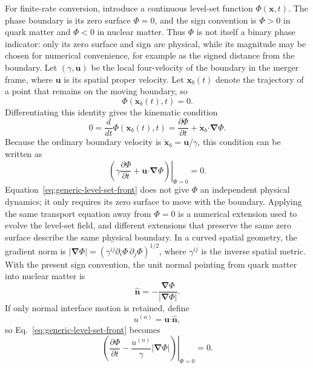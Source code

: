 \documentclass[11pt]{article}
\begin{document}
For finite-rate conversion, introduce a continuous level-set function \(\Phi(\boldsymbol{x},t)\).
The phase boundary is its zero surface \(\Phi=0\), and the sign convention is \(\Phi>0\) in quark matter and \(\Phi<0\) in nuclear matter.
Thus \(\Phi\) is not itself a binary phase indicator: only its zero surface and sign are physical, while its magnitude may be chosen for numerical convenience, for example as the signed distance from the boundary.
Let \((\gamma,\boldsymbol{u})\) be the local four-velocity of the boundary in the merger frame, where \(\boldsymbol{u}\) is its spatial proper velocity.
Let \(\boldsymbol{x}_b(t)\) denote the trajectory of a point that remains on the moving boundary, so
\begin{equation}
\Phi(\boldsymbol{x}_b(t),t)=0.
\end{equation}
Differentiating this identity gives the kinematic condition
\begin{equation}
0
=
\frac{d}{dt}\Phi(\boldsymbol{x}_b(t),t)
=
\frac{\partial\Phi}{\partial t}
+
\dot{\boldsymbol{x}}_b
\boldsymbol{\cdot}
\boldsymbol{\nabla}\Phi.
\end{equation}
Because the ordinary boundary velocity is \(\dot{\boldsymbol{x}}_b=\boldsymbol{u}/\gamma\), this condition can be written as
\begin{equation}
\left.
\left(
\gamma
\frac{\partial\Phi}{\partial t}
+
\boldsymbol{u}
\boldsymbol{\cdot}
\boldsymbol{\nabla}\Phi
\right)
\right|_{\Phi=0}
=0.
\label{eq:generic-level-set-front}
\end{equation}
Equation~\eqref{eq:generic-level-set-front} does not give \(\Phi\) an independent physical dynamics; it only requires its zero surface to move with the boundary.
Applying the same transport equation away from \(\Phi=0\) is a numerical extension used to evolve the level-set field, and different extensions that preserve the same zero surface describe the same physical boundary.
In a curved spatial geometry, the gradient norm is \(\left|\boldsymbol{\nabla}\Phi\right|=(\gamma^{ij}\partial_i\Phi\,\partial_j\Phi)^{1/2}\), where \(\gamma^{ij}\) is the inverse spatial metric.
With the present sign convention, the unit normal pointing from quark matter into nuclear matter is
\begin{equation}
\widehat{\boldsymbol{n}}
=
-
\frac{\boldsymbol{\nabla}\Phi}
{\left|\boldsymbol{\nabla}\Phi\right|}.
\end{equation}
If only normal interface motion is retained, define
\begin{equation}
u^{(n)}
=
\boldsymbol{u}
\boldsymbol{\cdot}
\widehat{\boldsymbol{n}},
\end{equation}
so Eq.~\eqref{eq:generic-level-set-front} becomes
\begin{equation}
\left.
\left(
\frac{\partial\Phi}{\partial t}
-
\frac{u^{(n)}}{\gamma}
\left|\boldsymbol{\nabla}\Phi\right|
\right)
\right|_{\Phi=0}
=0.
\label{eq:normal-level-set-front}
\end{equation}
\end{document}
